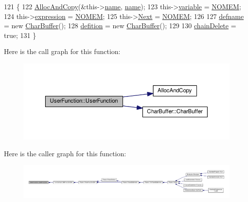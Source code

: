 \begin{DoxyCode}
121 \{
122     \hyperlink{clib_8h_a5bed05c70cb17e541fee570b5dc32e1a}{AllocAndCopy}(&this->\hyperlink{classUserFunction_a7cb07de0ad054d5001875aa2b3ad639d}{name}, \hyperlink{classUserFunction_a7cb07de0ad054d5001875aa2b3ad639d}{name});
123     this->\hyperlink{classUserFunction_a43e22a8c48e1d4770b0c4eadc3254aa8}{variable} = \hyperlink{platform_8h_a46ff2bfbf0d44b8466a2251d5bd5e6f8}{NOMEM};
124     this->\hyperlink{classUserFunction_ab7a0fb4f1265946883ef4e52dbe032f7}{expression} = \hyperlink{platform_8h_a46ff2bfbf0d44b8466a2251d5bd5e6f8}{NOMEM};
125     this->\hyperlink{classUserFunction_a5463f575d2ed50c0dbe069ec2841a5c9}{Next} = \hyperlink{platform_8h_a46ff2bfbf0d44b8466a2251d5bd5e6f8}{NOMEM};
126 
127     \hyperlink{classUserFunction_a722d65ef9f73e516689cb474e318b9f7}{defname} = \textcolor{keyword}{new} \hyperlink{classCharBuffer}{CharBuffer}();
128     \hyperlink{classUserFunction_aa39d63ff3cb597dc0d97667743d21f77}{defition} = \textcolor{keyword}{new} \hyperlink{classCharBuffer}{CharBuffer}();
129 
130     \hyperlink{classUserFunction_a86fecef5db791181f188bef0d7898de0}{chainDelete} = \textcolor{keyword}{true};
131 \}
\end{DoxyCode}


Here is the call graph for this function\+:
\nopagebreak
\begin{figure}[H]
\begin{center}
\leavevmode
\includegraphics[width=350pt]{de/df8/classUserFunction_a9e07b00bd2ff918fd11767cb627ad7df_cgraph}
\end{center}
\end{figure}




Here is the caller graph for this function\+:
\nopagebreak
\begin{figure}[H]
\begin{center}
\leavevmode
\includegraphics[width=350pt]{de/df8/classUserFunction_a9e07b00bd2ff918fd11767cb627ad7df_icgraph}
\end{center}
\end{figure}


